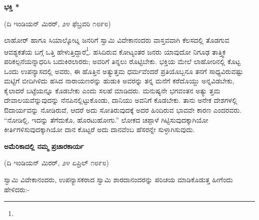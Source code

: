 \begin{center}
\textbf{ಭಕ್ತಿ *}
\end{center}

\begin{center}
(ದಿ ಇಂಡಿಯನ್ ಮಿರರ್, ೨೪ ಫೆಬ್ರವರಿ ೧೮೯೮)
\end{center}

ಲಾಹೋರ್ ಹಾಗೂ ಸಿಯಾಲ್ಕೋಟ್ನ ಜನರಿಗೆ ಸ್ವಾಮಿ ವಿವೇಕಾನಂದರು ವಾಸ್ತವವಾಗಿ ಕೆಲಸದಲ್ಲಿ ತೊಡಗುವ ಆವಶ್ಯಕತೆಯ ಬಗ್ಗೆ ಒತ್ತಿ ಹೇಳುತ್ತಿದ್ದಾರೆ\footnote{}. ಹಸಿದಿರುವ ಕೋಟ್ಯಂತರ ಜನರು ಯಾವುದೋ ನಿಗೂಢ ತಾತ್ತ್ವಿಕ ಪರಿಕಲ್ಪನೆಯನ್ನಾಧರಿಸಿ ಬದುಕಿರಲಾರರು; ಅವರಿಗೆ ತಿನ್ನಲು ರೊಟ್ಟಿಬೇಕು. ಭಕ್ತಿಯ ಮೇಲೆ ಲಾಹೋರಿನಲ್ಲಿ ಕೊಟ್ಟ ಒಂದು ಉಪನ್ಯಾಸದಲ್ಲಿ ಅವರು, ಈ ಹೊತ್ತಿನ ಅತ್ಯುತ್ತಮ ಧರ್ಮವೆಂದರೆ ಪ್ರತಿಯೊಬ್ಬನೂ ತನಗೆ ಸಾಧ್ಯವಿರುವಷ್ಟು ಮಟ್ಟಿಗೆ ಬೀದಿಗಿಳಿದು ಹಸಿದ ನಾರಾಯಣರನ್ನು ಹುಡುಕಿ ಅವರನ್ನು ತನ್ನ ಮನೆಗೆ ಕರೆದೊಯ್ದು ಅನ್ನವಿಡಬೇಕು, ಕೈಲಾದರೆ ಬಟ್ಟೆಯನ್ನೂ ಕೊಡಬೇಕು ಎಂದು ಸಲಹೆ ಮಾಡಿದರು. ಮನುಷ್ಯನೇ ಭಗವಂತನ ಅತ್ಯು ತ್ತಮ ದೇವಾಲಯವೆನ್ನುವುದನ್ನು ನೆನಪಿನಲ್ಲಿಟ್ಟುಕೊಂಡು, ದಾನಿಯು ಅವನಿಗೆ ಕೊಡಬೇಕು. ತಾನು ಅನೇಕ ದೇಶಗಳಲ್ಲಿ ಔದಾರ್ಯವನ್ನು ನೋಡಿರುವೆ, ಆದರೆ ಅದು ಸೋತಿರುವುದಕ್ಕೆ ಅದರ ಹಿಂದಿರುವ ಭಾವವೇ ಕಾರಣ ಎಂದರವರು. “ನೋಡಿಲ್ಲಿ, ಇದನ್ನು ತೆಗೆದುಕೊ, ಹೊರಟುಹೋಗು.” ಲೋಕದ ಚಪ್ಪಾಳೆ ಗಿಟ್ಟಿಸುವುದಕ್ಕಾಗಿಯೋ ಕೀರ್ತಿಗಳಿಸುವುದಕ್ಕಾಗಿಯೋ ದಾನ ಕೊಟ್ಟರೆ ಅದು ದಾನವೆಂಬ ಹೆಸರನ್ನೇ ಸುಳ್ಳಾಗಿಸುವುದು.

\begin{center}
\textbf{ಅಮೆರಿಕಾದಲ್ಲಿ ನಮ್ಮ ಪ್ರಚಾರಕಾರ್ಯ}
\end{center}

\begin{center}
(ದಿ ಇಂಡಿಯನ್ ಮಿರರ್, ೨೪ ಏಪ್ರಿಲ್ ೧೮೯೮)
\end{center}

ಸ್ವಾಮಿ ವಿವೇಕಾನಂದರು, ಉಪನ್ಯಾಸಕರಾದ ಸ್ವಾಮಿ ಶಾರದಾನಂದರನ್ನು ಪರಿಚಯ ಮಾಡಿಕೊಡುತ್ತ ಹೀಗೆಂದು ಹೇಳಿದರು:-

